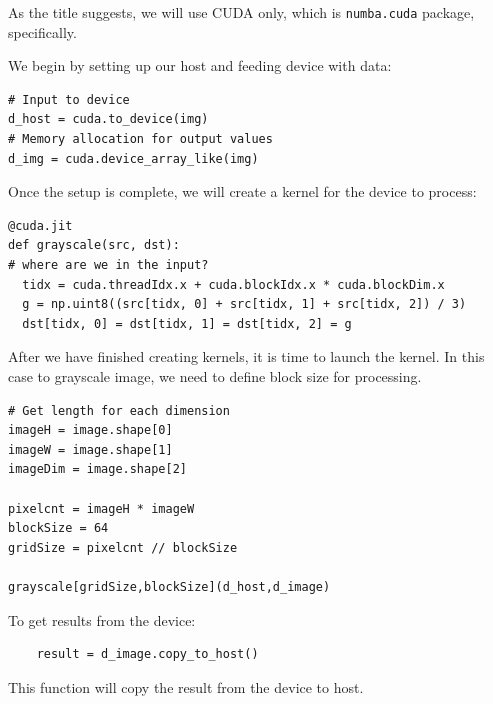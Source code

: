 \documentclass{article}
\begin{document}
As the title suggests, we will use CUDA only, which is \texttt{numba.cuda} package, specifically. 

 We begin by setting up our host and feeding device with data:

\begin{verbatim}
# Input to device
d_host = cuda.to_device(img)
# Memory allocation for output values
d_img = cuda.device_array_like(img)
\end{verbatim}

Once the setup is complete, we will create a kernel for the device to process:

\begin{verbatim}
@cuda.jit
def grayscale(src, dst):
# where are we in the input?
  tidx = cuda.threadIdx.x + cuda.blockIdx.x * cuda.blockDim.x
  g = np.uint8((src[tidx, 0] + src[tidx, 1] + src[tidx, 2]) / 3)
  dst[tidx, 0] = dst[tidx, 1] = dst[tidx, 2] = g
\end{verbatim}

After we have finished creating kernels, it is time to launch the kernel. In this case to grayscale image, we need to define block size for processing. 

\begin{verbatim}
# Get length for each dimension
imageH = image.shape[0]
imageW = image.shape[1]
imageDim = image.shape[2]

pixelcnt = imageH * imageW
blockSize = 64
gridSize = pixelcnt // blockSize

grayscale[gridSize,blockSize](d_host,d_image)
\end{verbatim}

To get results from the device: 
\begin{verbatim}
    result = d_image.copy_to_host()
\end{verbatim}

This function will copy the result from the device to host. 
\end{document}
